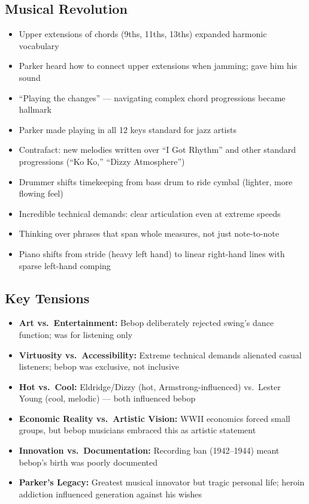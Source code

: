 \documentclass[11pt, letterpaper]{article}
\begin{document}
\subsection{Musical Revolution}
\begin{itemize}
    \item Upper extensions of chords (9ths, 11ths, 13ths) expanded harmonic vocabulary
    \item Parker heard how to connect upper extensions when jamming; gave him his sound
    \item ``Playing the changes'' --- navigating complex chord progressions became hallmark
    \item Parker made playing in all 12 keys standard for jazz artists
    \item Contrafact: new melodies written over ``I Got Rhythm'' and other standard progressions (``Ko Ko,'' ``Dizzy Atmosphere'')
    \item Drummer shifts timekeeping from bass drum to ride cymbal (lighter, more flowing feel)
    \item Incredible technical demands: clear articulation even at extreme speeds
    \item Thinking over phrases that span whole measures, not just note-to-note
    \item Piano shifts from stride (heavy left hand) to linear right-hand lines with sparse left-hand comping
\end{itemize}

\subsection{Key Tensions}
\begin{itemize}
    \item \textbf{Art vs.\ Entertainment:} Bebop deliberately rejected swing's dance function; was for listening only
    \item \textbf{Virtuosity vs.\ Accessibility:} Extreme technical demands alienated casual listeners; bebop was exclusive, not inclusive
    \item \textbf{Hot vs.\ Cool:} Eldridge/Dizzy (hot, Armstrong-influenced) vs.\ Lester Young (cool, melodic) --- both influenced bebop
    \item \textbf{Economic Reality vs.\ Artistic Vision:} WWII economics forced small groups, but bebop musicians embraced this as artistic statement
    \item \textbf{Innovation vs.\ Documentation:} Recording ban (1942--1944) meant bebop's birth was poorly documented
    \item \textbf{Parker's Legacy:} Greatest musical innovator but tragic personal life; heroin addiction influenced generation against his wishes
\end{itemize}
\end{document}
